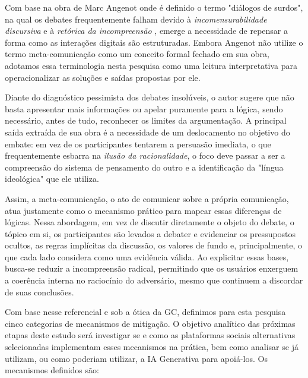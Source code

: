 \documentclass[conference]{IEEEtran} \IEEEoverridecommandlockouts %
\begin{document}
Com base na obra de Marc Angenot onde é definido o termo "diálogos de surdos", na qual os debates frequentemente falham devido à \textit{incomensurabilidade discursiva} e à \textit{retórica da incompreensão} \cite{angenot2008dialogues}, emerge a necessidade de repensar a forma como as interações digitais são estruturadas. Embora Angenot não utilize o termo meta-comunicação como um conceito formal fechado em sua obra, adotamos essa terminologia nesta pesquisa como uma leitura interpretativa para operacionalizar as soluções e saídas propostas por ele. 

Diante do diagnóstico pessimista dos debates insolúveis, o autor sugere que não basta apresentar mais informações ou apelar puramente para a lógica, sendo necessário, antes de tudo, reconhecer os limites da argumentação. A principal saída extraída de sua obra é a necessidade de um deslocamento no objetivo do embate: em vez de os participantes tentarem a persuasão imediata, o que frequentemente esbarra na \textit{ilusão da racionalidade}, o foco deve passar a ser a compreensão do sistema de pensamento do outro e a identificação da "língua ideológica" que ele utiliza.

Assim, a meta-comunicação, o ato de comunicar sobre a própria comunicação, atua justamente como o mecanismo prático para mapear essas diferenças de lógicas. Nessa abordagem, em vez de discutir diretamente o objeto do debate, o tópico em si, os participantes são levados a debater e evidenciar os pressupostos ocultos, as regras implícitas da discussão, os valores de fundo e, principalmente, o que cada lado considera como uma evidência válida. Ao explicitar essas bases, busca-se reduzir a incompreensão radical, permitindo que os usuários enxerguem a coerência interna no raciocínio do adversário, mesmo que continuem a discordar de suas conclusões.


Com base nesse referencial e sob a ótica da GC, definimos para esta pesquisa cinco categorias de mecanismos de mitigação. O objetivo analítico das próximas etapas deste estudo será investigar se e como as plataformas sociais alternativas selecionadas implementam esses mecanismos na prática, bem como analisar se já utilizam, ou como poderiam utilizar, a IA Generativa para apoiá-los. Os mecanismos definidos são:
\end{document}
